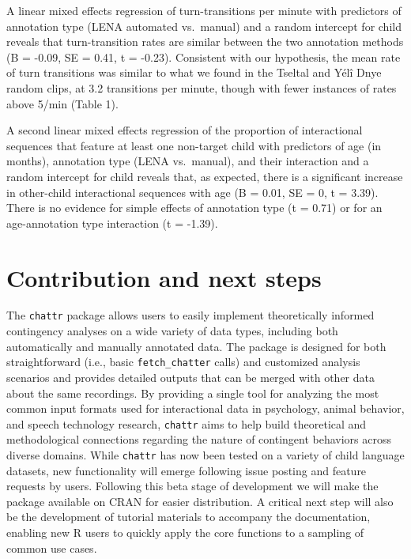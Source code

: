 \documentclass[10pt, letterpaper]{article}
\begin{document}
A linear mixed effects regression of turn-transitions per minute with
predictors of annotation type (LENA automated vs.~manual) and a random
intercept for child reveals that turn-transition rates are similar
between the two annotation methods (B = -0.09, SE = 0.41, t = -0.23).
Consistent with our hypothesis, the mean rate of turn transitions was
similar to what we found in the Tseltal and Yélî Dnye random clips, at
3.2 transitions per minute, though with fewer instances of rates above
5/min (Table 1).

A second linear mixed effects regression of the proportion of
interactional sequences that feature at least one non-target child with
predictors of age (in months), annotation type (LENA vs.~manual), and
their interaction and a random intercept for child reveals that, as
expected, there is a significant increase in other-child interactional
sequences with age (B = 0.01, SE = 0, t = 3.39). There is no evidence
for simple effects of annotation type (t = 0.71) or for an
age-annotation type interaction (t = -1.39).

\hypertarget{contribution-and-next-steps}{%
\section{Contribution and next
steps}\label{contribution-and-next-steps}}

The \texttt{chattr} package allows users to easily implement
theoretically informed contingency analyses on a wide variety of data
types, including both automatically and manually annotated data. The
package is designed for both straightforward (i.e., basic
\texttt{fetch\_chatter} calls) and customized analysis scenarios and
provides detailed outputs that can be merged with other data about the
same recordings. By providing a single tool for analyzing the most
common input formats used for interactional data in psychology, animal
behavior, and speech technology research, \texttt{chattr} aims to help
build theoretical and methodological connections regarding the nature of
contingent behaviors across diverse domains. While \texttt{chattr} has
now been tested on a variety of child language datasets, new
functionality will emerge following issue posting and feature requests
by users. Following this beta stage of development we will make the
package available on CRAN for easier distribution. A critical next step
will also be the development of tutorial materials to accompany the
documentation, enabling new R users to quickly apply the core functions
to a sampling of common use cases.
\end{document}
